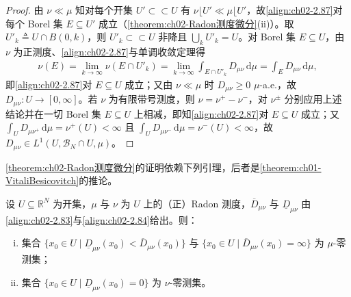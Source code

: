 \documentclass[../../main.tex]{subfiles}%
\begin{document}
\begin{proof}
由 $\nu\ll\mu$ 知对每个开集 $U'\subset\subset U$ 有 $\nu\lfloor U'\ll\mu\lfloor U'$，故\eqref{align:ch02-2.87}对每个 Borel 集 $E\subseteq U'$ 成立（\cref{theorem:ch02-Radon测度微分}(ii)）。取 $U'_k\triangleq U\cap B(0,k)$，则 $U'_k\subset\subset U$ 非降且 $\bigcup_kU'_k=U$。对 Borel 集 $E\subseteq U$，由 $\nu$ 为正测度、\eqref{align:ch02-2.87}与单调收敛定理得
\begin{align*}
\nu(E)=\lim_{k\to\infty}\nu(E\cap U'_k)=\lim_{k\to\infty}\int_{E\cap U'_k}D_{\mu\nu}\,\mathrm{d}\mu=\int_ED_{\mu\nu}\,\mathrm{d}\mu,
\end{align*}
即\eqref{align:ch02-2.87}对 $E\subseteq U$ 成立；又由 $\nu\ll\mu$ 时 $D_{\mu\nu}\geqslant0$ $\mu$-a.e.，故 $D_{\mu\nu}:U\to[0,\infty]$。若 $\nu$ 为有限带号测度，则 $\nu=\nu^+-\nu^-$，对 $\nu^\pm$ 分别应用上述结论并在一切 Borel 集 $E\subseteq U$ 上相减，即知\eqref{align:ch02-2.87}对 $E\subseteq U$ 成立；又 $\int_UD_{\mu\nu^+}\,\mathrm{d}\mu=\nu^+(U)<\infty$ 且 $\int_UD_{\mu\nu^-}\,\mathrm{d}\mu=\nu^-(U)<\infty$，故 $D_{\mu\nu}\in L^1(U,\mathscr B_N\cap U,\mu)$。
\end{proof}

\cref{theorem:ch02-Radon测度微分}的证明依赖下列引理，后者是\cref{theorem:ch01-VitaliBesicovitch}的推论。

\begin{lemma}\label{lemma:ch02-微分零测}
设 $U\subseteq\mathbb R^N$ 为开集，$\mu$ 与 $\nu$ 为 $U$ 上的（正）Radon 测度，$\overline{D}_{\mu\nu}$ 与 $\underline{D}_{\mu\nu}$ 由\eqref{align:ch02-2.83}与\eqref{align:ch02-2.84}给出。则：
\begin{enumerate}[(i)]
\item 集合 $\{x_0\in U\mid\underline{D}_{\mu\nu}(x_0)<\overline{D}_{\mu\nu}(x_0)\}$ 与 $\{x_0\in U\mid\overline{D}_{\mu\nu}(x_0)=\infty\}$ 为 $\mu$-零测集；
\item 集合 $\{x_0\in U\mid\underline{D}_{\mu\nu}(x_0)=0\}$ 为 $\nu$-零测集。
\end{enumerate}
\end{lemma}
\end{document}
